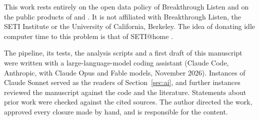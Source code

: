 \documentclass[twocolumn]{aastex631}
\begin{document}
\begin{acknowledgments}

This work rests entirely on the open data policy of Breakthrough Listen and
on the public products of \citet{Price2020} and \citet{Lebofsky2019}. It is
not affiliated with Breakthrough Listen, the SETI Institute or the
University of California, Berkeley.
The idea of donating idle computer time to this problem is that of
SETI@home \citep{Anderson2002,Anderson2025}.

The pipeline, its tests, the analysis scripts and a first draft of this
manuscript were written with a large-language-model coding assistant
(Claude Code, Anthropic, with Claude Opus and Fable models, November 2026).
Instances of Claude Sonnet served as the readers of Section~\ref{sec:ai},
and further instances reviewed the manuscript against the code and the
literature. Statements about prior work were checked against the cited
sources. The author directed the work, approved every closure made by hand,
and is responsible for the content.
\end{acknowledgments}



{}

\end{document}
